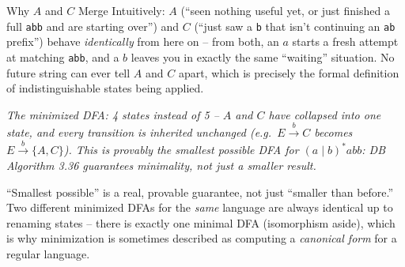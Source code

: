 \documentclass[full-course-notes.tex]{subfiles}
\begin{document}
\begin{examplebox}{Why $A$ and $C$ Merge}
Intuitively: $A$ (``seen nothing useful yet, or just finished a full \texttt{abb} and are
starting over'') and $C$ (``just saw a \texttt{b} that isn't continuing an \texttt{ab}
prefix'') behave \emph{identically} from here on -- from both, an $a$ starts a fresh attempt at
matching \texttt{abb}, and a $b$ leaves you in exactly the same ``waiting'' situation. No future
string can ever tell $A$ and $C$ apart, which is precisely the formal definition of
indistinguishable states being applied.
\end{examplebox}

\begin{center}
\end{center}

\begin{center}
\small\textit{The minimized DFA: 4 states instead of 5 -- $A$ and $C$ have collapsed into one
state, and every transition is inherited unchanged (e.g.\ $E\xrightarrow{b}C$ becomes
$E\xrightarrow{b}\{A,C\}$). This is provably the \emph{smallest possible} DFA for
$(a\mid b)^{*}abb$: DB Algorithm 3.36 guarantees minimality, not just a smaller result.}
\end{center}

\begin{examfocus}
``Smallest possible'' is a real, provable guarantee, not just ``smaller than before.'' Two
different minimized DFAs for the \emph{same} language are always identical up to renaming
states -- there is exactly one minimal DFA (isomorphism aside), which is why minimization is
sometimes described as computing a \emph{canonical form} for a regular language.
\end{examfocus}
\end{document}
